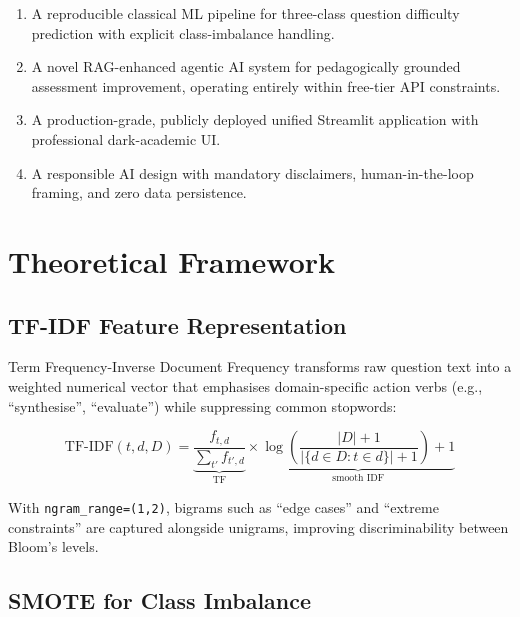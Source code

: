 \documentclass[12pt,a4paper]{article}
\begin{document}
\begin{enumerate}[leftmargin=2em,itemsep=2pt]
  \item A reproducible classical ML pipeline for three-class question difficulty prediction
        with explicit class-imbalance handling.
  \item A novel RAG-enhanced agentic AI system for pedagogically grounded assessment
        improvement, operating entirely within free-tier API constraints.
  \item A production-grade, publicly deployed unified Streamlit application with
        professional dark-academic UI.
  \item A responsible AI design with mandatory disclaimers, human-in-the-loop framing,
        and zero data persistence.
\end{enumerate}

\section{Theoretical Framework}

\subsection{TF-IDF Feature Representation}

Term Frequency-Inverse Document Frequency transforms raw question text into a weighted
numerical vector that emphasises domain-specific action verbs (e.g., ``synthesise'',
``evaluate'') while suppressing common stopwords:

\begin{equation}
  \text{TF-IDF}(t,d,D) = \underbrace{\frac{f_{t,d}}{\sum_{t'}f_{t',d}}}_{\text{TF}} \times
  \underbrace{\log\!\left(\frac{|D|+1}{|\{d\in D : t\in d\}|+1}\right)+1}_{\text{smooth IDF}}
  \label{eq:tfidf}
\end{equation}

With \texttt{ngram\_range=(1,2)}, bigrams such as ``edge cases'' and ``extreme constraints''
are captured alongside unigrams, improving discriminability between Bloom's levels.

\subsection{SMOTE for Class Imbalance}
\end{document}
